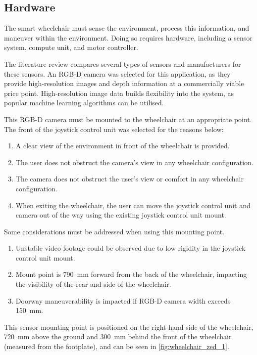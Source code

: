 \subsection{Hardware}
The smart wheelchair must sense the environment, process this information,
and maneuver within the environment. Doing so requires hardware, including a
sensor system, compute unit, and motor controller.

The literature review compares several types of sensors and manufacturers for these sensors.
An RGB-D camera was selected for this application, as they provide high-resolution images and depth
information at a commercially viable price point. High-resolution image data builds flexibility into
the system, as popular machine learning algorithms can be utilised.

This RGB-D camera must be mounted to the wheelchair at an appropriate point. The front of the
joystick control unit was selected for the reasons below:
\begin{enumerate}[topsep=0pt,itemsep=-1ex,partopsep=1ex,parsep=1ex]
    \item A clear view of the environment in front of the wheelchair is provided.
    \item The user does not obstruct the camera's view in any wheelchair configuration.
    \item The camera does not obstruct the user's view or comfort in any wheelchair configuration.
    \item When exiting the wheelchair, the user can move the joystick control unit and camera
            out of the way using the existing joystick control unit mount.
\end{enumerate}
Some considerations must be addressed when using this mounting point.
\begin{enumerate}[topsep=0pt,itemsep=-1ex,partopsep=1ex,parsep=1ex]
    \item Unstable video footage could be observed due to low rigidity in the joystick control unit mount.
    \item Mount point is \SI{790}{\milli\metre} forward from the back of the wheelchair, impacting
            the visibility of the rear and side of the wheelchair.
    \item Doorway maneuverability is impacted if RGB-D camera width exceeds \SI{150}{\milli\metre}.
\end{enumerate}
This sensor mounting point is positioned on the right-hand side of the wheelchair,
\SI{720}{\milli\metre} above the ground and \SI{300}{\milli\metre} behind the
front of the wheelchair (measured from the footplate), and can be seen in \cref{fig:wheelchair_zed_1}.

